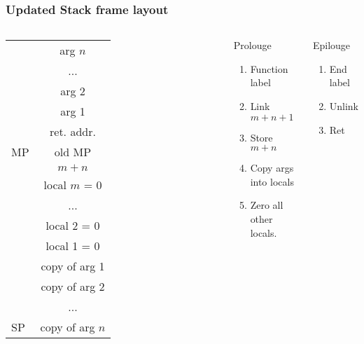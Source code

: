 \documentclass{beamer}
\begin{document}
\begin{frame}[fragile]
\frametitle{Updated Stack frame layout}
\begin{columns}[c]
\begin{tabular}{l | c |}
  & arg $n$ \\
\cline{2-2}
  & ... \\
\cline{2-2}
  & arg 2 \\
\cline{2-2}
  & arg 1 \\
\cline{2-2}
  & ret. addr.  \\
\cline{2-2}
MP& old MP \\
\cline{2-2}
  & $m+n$ \\
\cline{2-2}
  & local $m$ = 0 \\
\cline{2-2}
  & ... \\
\cline{2-2}
  & local 2 = 0\\
\cline{2-2}
  & local 1 = 0 \\
\cline{2-2}
  & copy of arg 1 \\
\cline{2-2}
  & copy of arg 2 \\
\cline{2-2}
  & ... \\
\cline{2-2}
SP& copy of arg $n$ 
\end{tabular}


\begin{block}{Prolouge}
\begin{enumerate}
\item Function label
\item Link $m + n + 1$
\item Store $m + n$
\item Copy args into locals
\item Zero all other locals.
\end{enumerate}

\end{block}

\begin{block}{Epilouge}
\begin{enumerate}
\item End label
\item Unlink
\item Ret
\end{enumerate}
\end{block}
\end{columns}
\end{frame}
\end{document}
